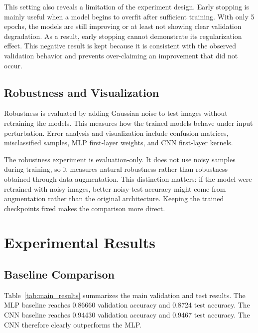 \documentclass[10pt,twocolumn]{article}
\begin{document}
This setting also reveals a limitation of the experiment design. Early stopping is mainly useful when a model begins to overfit after sufficient training. With only 5 epochs, the models are still improving or at least not showing clear validation degradation. As a result, early stopping cannot demonstrate its regularization effect. This negative result is kept because it is consistent with the observed validation behavior and prevents over-claiming an improvement that did not occur.

\subsection{Robustness and Visualization}
Robustness is evaluated by adding Gaussian noise to test images without retraining the models. This measures how the trained models behave under input perturbation. Error analysis and visualization include confusion matrices, misclassified samples, MLP first-layer weights, and CNN first-layer kernels.

The robustness experiment is evaluation-only. It does not use noisy samples during training, so it measures natural robustness rather than robustness obtained through data augmentation. This distinction matters: if the model were retrained with noisy images, better noisy-test accuracy might come from augmentation rather than the original architecture. Keeping the trained checkpoints fixed makes the comparison more direct.

\section{Experimental Results}
\subsection{Baseline Comparison}
Table~\ref{tab:main_results} summarizes the main validation and test results. The MLP baseline reaches 0.86660 validation accuracy and 0.8724 test accuracy. The CNN baseline reaches 0.94430 validation accuracy and 0.9467 test accuracy. The CNN therefore clearly outperforms the MLP.
\end{document}
